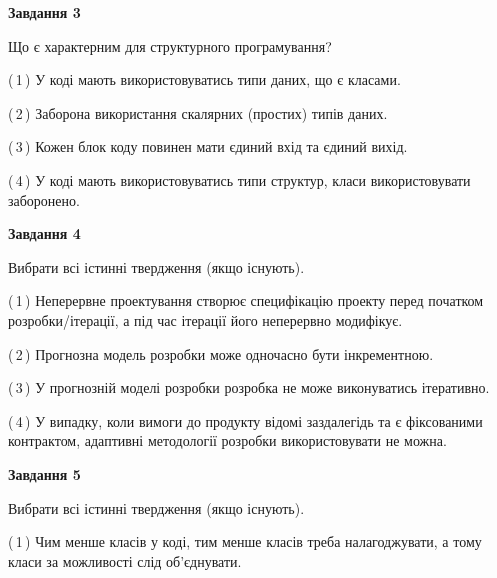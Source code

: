 \documentclass[10pt, ukrainian]{article}
\begin{document}
{\begin {large}
{\begin {center}\textbf{Завдання 3}\end {center}}\par
Що є характерним для структурного програмування?\par
\vspace{2mm}



(\,1\,) У коді мають використовуватись типи даних, що є класами. %



(\,2\,) Заборона використання скалярних (простих) типів даних. %



(\,3\,) Кожен блок коду повинен мати єдиний вхід та єдиний вихід.%



(\,4\,) У коді мають використовуватись типи структур, класи використовувати заборонено. %


{\begin {center}\textbf{Завдання 4}\end {center}}\par
Вибрати всі істинні твердження (якщо існують).\par
\vspace{2mm}



(\,1\,) Неперервне проектування створює специфікацію проекту перед початком розробки/ітерації, а під час ітерації його неперервно модифікує.%



(\,2\,) Прогнозна модель розробки може одночасно бути інкрементною. %



(\,3\,) У прогнозній моделі розробки розробка не може виконуватись ітеративно. %



(\,4\,) У випадку, коли вимоги до продукту відомі заздалегідь та є фіксованими контрактом, адаптивні методології розробки використовувати не можна. %


{\begin {center}\textbf{Завдання 5}\end {center}}\par
Вибрати всі істинні твердження (якщо існують).\par
\vspace{2mm}



(\,1\,) Чим менше класів у коді, тим менше класів треба налагоджувати, а тому класи за можливості слід об'єднувати. %




\end{large}}
\end{document}
